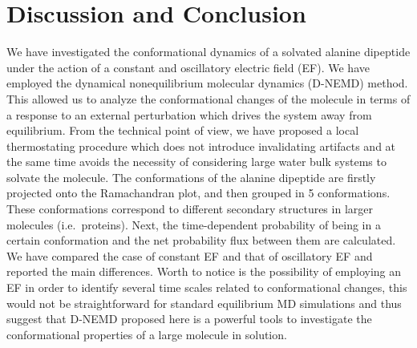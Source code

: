 \documentclass[a4paper,preprint,unsortedaddress,onecolumn]{revtex4-1}
\newcommand{\recheck}[1]{{\color{red} #1}}
\begin{document}


\section{Discussion and Conclusion}
We have investigated the conformational
dynamics of \recheck{a solvated} alanine dipeptide under the action of a constant and oscillatory electric
field (EF).
\recheck{ We have employed the dynamical nonequilibrium molecular dynamics (D-NEMD) method. This allowed us to analyze the conformational changes of the molecule in terms of a response to an external perturbation which drives the system away from equilibrium. From the technical point of view, we have proposed a local thermostating procedure which does not introduce invalidating artifacts and at the same time avoids the necessity of considering large water bulk systems to solvate the molecule.}
The conformations of the alanine dipeptide are
firstly projected onto the Ramachandran plot, and
then grouped in 5  conformations.
These conformations
correspond to different secondary structures in larger molecules
(i.e.~proteins).
Next, the time-dependent probability
of being in a certain conformation and the net probability flux
between them are calculated.
\recheck{We have compared the case of constant EF and that of oscillatory EF
and reported the main differences.
Worth to notice is the possibility of employing an EF in order to identify several time scales related to conformational changes, this would not be straightforward for standard equilibrium MD simulations and thus suggest that D-NEMD proposed here is a powerful tools to investigate the conformational properties of a large molecule in solution.}
\end{document}
